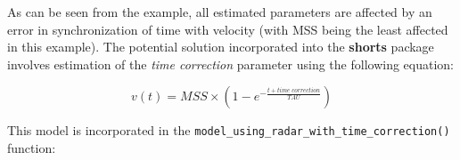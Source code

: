 \documentclass[fleqn,10pt,lineno]{wlpeerj} %
\newenvironment{Shaded}{\begin{snugshade}}{\end{snugshade}}
\newcommand{\AttributeTok}[1]{\textcolor[rgb]{0.77,0.63,0.00}{#1}}
\newcommand{\CommentTok}[1]{\textcolor[rgb]{0.56,0.35,0.01}{\textit{#1}}}
\newcommand{\FunctionTok}[1]{\textcolor[rgb]{0.00,0.00,0.00}{#1}}
\newcommand{\NormalTok}[1]{#1}
\newcommand{\OtherTok}[1]{\textcolor[rgb]{0.56,0.35,0.01}{#1}}
\newcommand{\SpecialCharTok}[1]{\textcolor[rgb]{0.00,0.00,0.00}{#1}}
\newcommand{\StringTok}[1]{\textcolor[rgb]{0.31,0.60,0.02}{#1}}
\begin{document}
As can be seen from the example, all estimated parameters are affected by an error in synchronization of time with velocity (with MSS being the least affected in this example). The potential solution incorporated into the \textbf{shorts} package involves estimation of the \emph{time correction} parameter using the following equation:

\begin{equation}
  v(t) = MSS \times (1 - e^{-\frac{t + time \; correction}{TAU}}) \label{eq:velocity-time-correction}
\end{equation}

This model is incorporated in the \texttt{model\_using\_radar\_with\_time\_correction()} function:

\begin{Shaded}
\end{Shaded}
\end{document}
